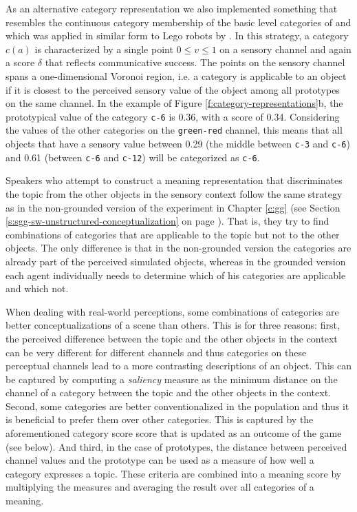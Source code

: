 As an alternative category representation we
also implemented something that resembles the continuous category
membership of the basic level categories of \cite{rosch73natural} and
which was applied in similar form to Lego robots by
\cite{vogt03anchoring}. In this strategy, a category $c(a)$ is
characterized by a single point $0 \leq v \leq 1$ on a sensory channel
and again a score $\delta$ that reflects communicative success. The
points on the sensory channel spans a one-dimensional Voronoi region,
i.e. a category is applicable to an object if it is closest to the
perceived sensory value of the object among all prototypes on the same
channel. In the example of Figure \ref{f:category-representations}b,
the prototypical value of the category \texttt{c-6} is 0.36, with a
score of 0.34. Considering the values of the other categories on the
\texttt{green-red} channel, this means that all objects that have a
sensory value between 0.29 (the middle between \texttt{c-3} and
\texttt{c-6}) and 0.61 (between \texttt{c-6} and \texttt{c-12}) will
be categorized as \texttt{c-6}.


 Speakers who attempt to construct a
meaning representation that discriminates the topic from the other
objects in the sensory context follow the same strategy as in the
non-grounded version of the experiment in Chapter \ref{c:gg} (see
Section \ref{s:sgg-sw-unstructured-conceptualization} on page
\pageref{s:sgg-sw-unstructured-conceptualization}). That is, they try
to find combinations of categories that are applicable to the topic
but not to the other objects. The only difference is that in the
non-grounded version the categories are already part of the perceived
simulated objects, whereas in the grounded version each agent
individually needs to determine which of his categories are applicable
and which not.


 When dealing with
real-world perceptions, some combinations of categories are better
conceptualizations of a scene than others. This is for three reasons:
first, the perceived difference between the topic and the other
objects in the context can be very different for different channels
and thus categories on these perceptual channels lead to a more
contrasting descriptions of an object. This can be captured by
computing a \emph{saliency} measure as the minimum distance on the
channel of a category between the topic and the other objects in the
context. Second, some categories are better conventionalized in the
population and thus it is beneficial to prefer them over other
categories. This is captured by the aforementioned category score
score that is updated as an outcome of the game (see below). And
third, in the case of prototypes, the distance between perceived
channel values and the prototype can be used as a measure of how well
a category expresses a topic. These criteria are combined into a
meaning score by multiplying the measures and averaging the result
over all categories of a meaning.


